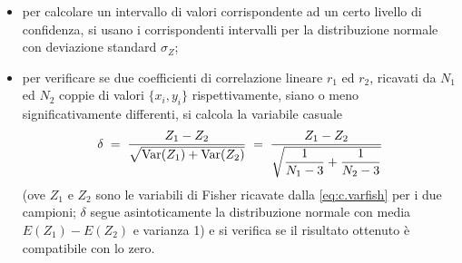 \begin{itemize}
\begin{itemize}
    controlla la compatibilit\`a con la distribuzione
    normale $N(Z(\rho), \sigma_Z)$ del valore ottenuto
    $Z(r)$;
  \item per calcolare un intervallo di valori corrispondente
    ad un certo livello di confidenza, si usano i
    corrispondenti intervalli per la distribuzione normale
    con deviazione standard $\sigma_Z$;
  \item per verificare se due coefficienti di correlazione
    lineare $r_1$ ed $r_2$, ricavati da $N_1$ ed $N_2$
    coppie di valori $\{ x_i, y_i \}$ rispettivamente, siano
    o meno significativamente differenti, si calcola la
    variabile casuale
    \begin{equation*}
      \delta \; =  \; \frac{Z_1 - Z_2}{\sqrt{\operatorname{Var}( Z_1 ) +
      \operatorname{Var}( Z_2 ) }} \; = \; \frac{Z_1 - Z_2}{\sqrt{
      \dfrac{1}{N_1 - 3} + \dfrac{1}{N_2 - 3} } }
    \end{equation*}
    (ove $Z_1$ e $Z_2$ sono le variabili di Fisher ricavate
    dalla \eqref{eq:c.varfish} per i due campioni; $\delta$
    segue asintoticamente la distribuzione normale con media
    $E(Z_1) - E(Z_2)$ e varianza 1) e si verifica se il
    risultato ottenuto \`e compatibile con lo zero.
  \end{itemize}
\end{itemize}%


